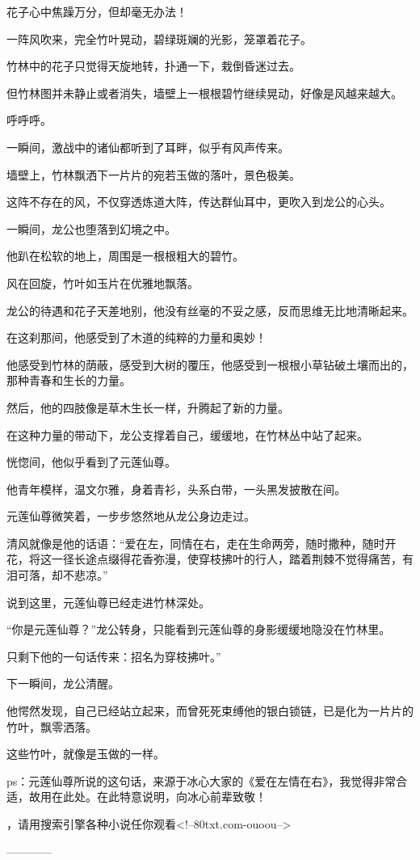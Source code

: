 \begin{this_body}
花子心中焦躁万分，但却毫无办法！

一阵风吹来，完全竹叶晃动，碧绿斑斓的光影，笼罩着花子。

竹林中的花子只觉得天旋地转，扑通一下，栽倒昏迷过去。

但竹林图并未静止或者消失，墙壁上一根根碧竹继续晃动，好像是风越来越大。

呼呼呼。

一瞬间，激战中的诸仙都听到了耳畔，似乎有风声传来。

墙壁上，竹林飘洒下一片片的宛若玉做的落叶，景色极美。

这阵不存在的风，不仅穿透炼道大阵，传达群仙耳中，更吹入到龙公的心头。

一瞬间，龙公也堕落到幻境之中。

他趴在松软的地上，周围是一根根粗大的碧竹。

风在回旋，竹叶如玉片在优雅地飘落。

龙公的待遇和花子天差地别，他没有丝毫的不妥之感，反而思维无比地清晰起来。

在这刹那间，他感受到了木道的纯粹的力量和奥妙！

他感受到竹林的荫蔽，感受到大树的覆压，他感受到一根根小草钻破土壤而出的，那种青春和生长的力量。

然后，他的四肢像是草木生长一样，升腾起了新的力量。

在这种力量的带动下，龙公支撑着自己，缓缓地，在竹林丛中站了起来。

恍惚间，他似乎看到了元莲仙尊。

他青年模样，温文尔雅，身着青衫，头系白带，一头黑发披散在间。

元莲仙尊微笑着，一步步悠然地从龙公身边走过。

清风就像是他的话语：“爱在左，同情在右，走在生命两旁，随时撒种，随时开花，将这一径长途点缀得花香弥漫，使穿枝拂叶的行人，踏着荆棘不觉得痛苦，有泪可落，却不悲凉。”

说到这里，元莲仙尊已经走进竹林深处。

“你是元莲仙尊？”龙公转身，只能看到元莲仙尊的身影缓缓地隐没在竹林里。

只剩下他的一句话传来：招名为穿枝拂叶。”

下一瞬间，龙公清醒。

他愕然发现，自己已经站立起来，而曾死死束缚他的银白锁链，已是化为一片片的竹叶，飘零洒落。

这些竹叶，就像是玉做的一样。

ps：元莲仙尊所说的这句话，来源于冰心大家的《爱在左情在右》，我觉得非常合适，故用在此处。在此特意说明，向冰心前辈致敬！

，请用搜索引擎各种小说任你观看<!--80txt.com-ouoou-->

------------

\end{this_body}

